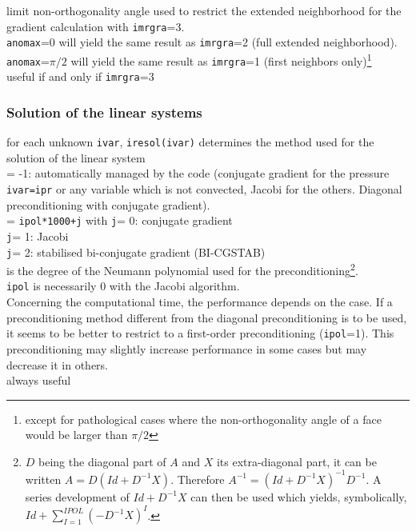 {limit non-orthogonality angle used to restrict the extended neighborhood for
the gradient calculation with {\tt imrgra}=3.\\
{\tt anomax}=0 will yield the same result as {\tt imrgra}=2 (full extended
neighborhood). {\tt anomax}=$\pi/2$ will yield the same result as
{\tt imrgra}=1
(first neighbors only)\footnote{except for pathological cases where the
non-orthogonality angle of a face would be larger than $\pi/2$}\\
useful if and only if {\tt imrgra}=3}

\subsubsection{Solution of the linear systems}

{for each unknown {\tt ivar}, {\tt iresol(ivar)} determines the method used
for the solution of the linear system\\
\hspace*{1.3cm}= -1: automatically managed by the code (conjugate
gradient for the pressure {\tt ivar=ipr} or any variable which is not
convected, Jacobi for the others. Diagonal preconditioning with
conjugate gradient).\\
\hspace*{1.3cm}= {\tt ipol*1000+j} with {\tt j}= 0: conjugate gradient\\
\hspace*{1.3cm} {\tt j}= 1: Jacobi\\
\hspace*{1.3cm} {\tt j}= 2: stabilised
bi-conjugate gradient (BI-CGSTAB)\\
\hspace*{1.3cm}{\tt ipol} is the degree of the Neumann polynomial used for the
preconditioning\footnote{$D$ being the diagonal part of $A$ and $X$ its
extra-diagonal part, it can be written
$A=D(Id+D^{-1}X)$. Therefore \mbox{$A^{-1}=(Id+D^{-1}X)^{-1}D^{-1}$}. A series
development of $Id+D^{-1}X$ can then be used which yields, symbolically,
\mbox{$Id+\sum\limits_{I=1}^{IPOL}\left(-D^{-1}X\right)^{I}$}.}.\\
{\tt ipol} is necessarily 0 with the Jacobi algorithm.\\
Concerning the computational time, the performance depends on the
case. If a preconditioning method different from
the diagonal preconditioning is to be used, it seems to be better to restrict
to a first-order preconditioning ({\tt ipol}=1). This preconditioning may
slightly increase performance in some cases but may decrease it in others.\\
always useful}


